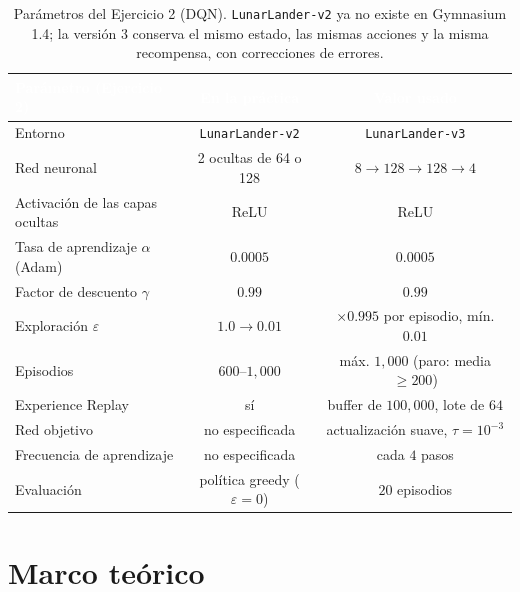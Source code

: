 \documentclass[11pt]{article}
\begin{document}
\begin{table}[H]
\centering
\renewcommand{\arraystretch}{1.2}
\begin{tabular}{|l|c|c|}
\hline
\rowcolor{iberoblue}\textcolor{white}{\textbf{Parámetro (Ejercicio 2)}} & \textcolor{white}{\textbf{En la práctica}} & \textcolor{white}{\textbf{Valor usado}} \\ \hline
Entorno                                & \texttt{LunarLander-v2}          & \texttt{LunarLander-v3} \\ \hline
Red neuronal                           & 2 ocultas de 64 o 128           & $8 \to 128 \to 128 \to 4$ \\ \hline
Activación de las capas ocultas        & ReLU                            & ReLU \\ \hline
Tasa de aprendizaje $\alpha$ (Adam)    & $0.0005$                        & $0.0005$ \\ \hline
Factor de descuento $\gamma$           & $0.99$                          & $0.99$ \\ \hline
Exploración $\varepsilon$              & $1.0 \to 0.01$                  & $\times 0.995$ por episodio, mín. $0.01$ \\ \hline
Episodios                              & $600$--$1{,}000$                & máx. $1{,}000$ (paro: media $\ge 200$) \\ \hline
Experience Replay                      & sí                              & buffer de $100{,}000$, lote de $64$ \\ \hline
Red objetivo                           & no especificada                 & actualización suave, $\tau = 10^{-3}$ \\ \hline
Frecuencia de aprendizaje              & no especificada                 & cada $4$ pasos \\ \hline
Evaluación                             & política greedy ($\varepsilon = 0$) & $20$ episodios \\ \hline
\end{tabular}
\caption{Parámetros del Ejercicio 2 (DQN). \texttt{LunarLander-v2} ya no existe
en Gymnasium 1.4; la versión 3 conserva el mismo estado, las mismas acciones y la
misma recompensa, con correcciones de errores.}
\label{tbl:especificaciones2}
\end{table}

\section{Marco teórico}
\end{document}
